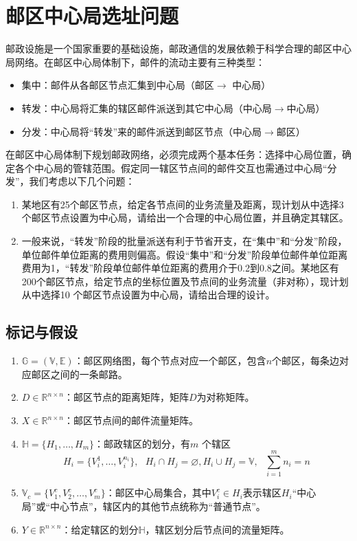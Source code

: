 \chapter{邮区中心局选址问题}
邮政设施是一个国家重要的基础设施，邮政通信的发展依赖于科学合理的邮区中心局网络。在邮区中心局体制下，邮件的流动主要有三种类型：
\begin{itemize}
  \item 集中：邮件从各邮区节点汇集到中心局（邮区$\rightarrow$ 中心局）
  \item 转发：中心局将汇集的辖区邮件派送到其它中心局（中心局$\rightarrow$中心局）
  \item 分发：中心局将“转发”来的邮件派送到邮区节点（中心局$\rightarrow$邮区）
\end{itemize}
在邮区中心局体制下规划邮政网络，必须完成两个基本任务：选择中心局位置，确定各个中心局的管辖范围。假定同一辖区节点间的邮件交互也需通过中心局“分发”，我们考虑以下几个问题：
\begin{enumerate}
  \item 某地区有25个邮区节点，给定各节点间的业务流量及距离，现计划从中选择3 个邮区节点设置为中心局，请给出一个合理的中心局位置，并且确定其辖区。
  \item 一般来说，“转发”阶段的批量派送有利于节省开支，在“集中”和“分发”阶段，单位邮件单位距离的费用则偏高。假设“集中”和“分发”阶段单位邮件单位距离费用为1，“转发”阶段单位邮件单位距离的费用介于0.2到0.8之间。某地区有200个邮区节点，给定节点的坐标位置及节点间的业务流量（非对称），现计划从中选择10 个邮区节点设置为中心局，请给出合理的设计。
\end{enumerate}

\ornamento
\section{标记与假设}
\begin{enumerate}
  \item $\mathbb{G} =(\mathbb{V},\mathbb{E})$：邮区网络图，每个节点对应一个邮区，包含$n$个邮区，每条边对应邮区之间的一条邮路。
  \item $D\in \mathbb{R}^{n\times n}$：邮区节点的距离矩阵，矩阵$D$为对称矩阵。
  \item $X\in \mathbb{R}^{n\times n}$：邮区节点间的邮件流量矩阵。
  \item $\mathbb{H}=\{H_1,\ldots,H_m\}$：邮政辖区的划分，有$m$ 个辖区
    \begin{equation}
        H_i = \{V_i^1,\ldots, V_i^{n_i}\},~~~ H_i\cap H_j = \varnothing, H_i\cup H_j = \mathbb V, ~~~\sum\limits_{i = 1}^m n_i = n
    \end{equation}
  \item $\mathbb V_c = \{V_1^c, V_2^c,\ldots, V_m^c\}$：邮区中心局集合，其中$V_i^c\in H_i$表示辖区$H_i$“中心局”或“中心节点”，辖区内的其他节点统称为“普通节点”。
  \item $Y\in \mathbb{R}^{n\times n}$：给定辖区的划分$\mathbb{H}$，辖区划分后节点间的流量矩阵。
\end{enumerate}

